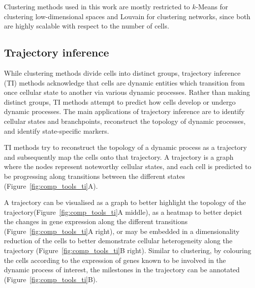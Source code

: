 Clustering methods used in this work are mostly restricted to $k$-Means for clustering low-dimensional spaces and Louvain for clustering networks, since both are highly scalable with respect to the number of cells.

\subsection{Trajectory inference}
While clustering methods divide cells into distinct groups, trajectory inference (TI) methods acknowledge that cells are dynamic entities which transition from once cellular state to another via various dynamic processes. Rather than making distinct groups, TI methods attempt to predict how cells develop or undergo dynamic processes. The main applications of trajectory inference are to identify cellular states and branchpoints, reconstruct the topology of dynamic processes, and identify state-specific markers. 

TI methods try to reconstruct the topology of a dynamic process as a trajectory and subsequently map the cells onto that trajectory. A trajectory is a graph where the nodes represent noteworthy cellular states, and each cell is predicted to be progressing along transitions between the different states (Figure~\ref{fig:comp_tools_ti}A).

A trajectory can be visualised as a graph to better highlight the topology of the trajectory(Figure~\ref{fig:comp_tools_ti}A middle), as a heatmap to better depict the changes in gene expression along the different transitions (Figure~\ref{fig:comp_tools_ti}A right), or may be embedded in a dimensionality reduction of the cells to better demonstrate cellular heterogeneity along the trajectory (Figure~\ref{fig:comp_tools_ti}B right). Similar to clustering, by colouring the cells according to the expression of genes known to be involved in the dynamic process of interest, the milestones in the trajectory can be annotated (Figure~\ref{fig:comp_tools_ti}B).

